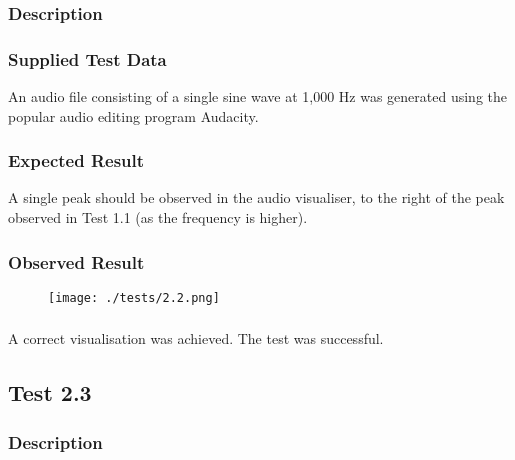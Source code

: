 \subsubsection{Description}
\paragraph{}
{
	\centering
}

\subsubsection{Supplied Test Data}
An audio file consisting of a single sine wave at 1,000 Hz was generated using the popular audio editing program Audacity.

\subsubsection{Expected Result}
A single peak should be observed in the audio visualiser, to the right of the peak observed in Test 1.1 (as the frequency is higher).

\subsubsection{Observed Result}
\begin{figure}[H]
	\texttt{[image: ./tests/2.2.png]}
\end{figure}

\subsubsection{}
A correct visualisation was achieved. The test was successful.

\pagebreak
\subsection{Test 2.3}
\subsubsection{Description}
\paragraph{}
{
	\centering
}

